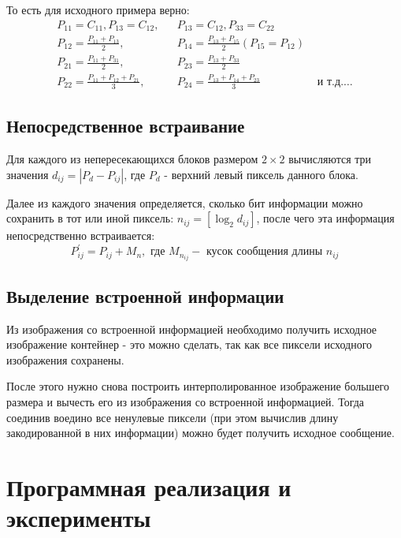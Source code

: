 \documentclass[a4paper]{article}
\begin{document}
  То есть для исходного примера верно:
  \begin{equation}
    \begin{aligned}
      P_{11} = C_{11}, P_{13} = C_{12}, && P_{13} = C_{12}, P_{33} = C_{22} \\
      P_{12} = \frac{P_{11} + P_{13}}{2}, && P_{14} = \frac{P_{13} + P_{15}}{2} (P_{15} = P_{12}) \\
      P_{21} = \frac{P_{11} + P_{31}}{2}, && P_{23} = \frac{P_{13} + P_{33}}{2} \\
      P_{22} = \frac{P_{11} + P_{12} + P_{21}}{3}, && P_{24} = \frac{P_{13} + P_{14} + P_{23}}{3} & \text{ и т.д.}\dots
    \end{aligned}
  \end{equation}

  \subsection{Непосредственное встраивание}

  Для каждого из непересекающихся блоков размером $2\times 2$ вычисляются
  три значения $d_{ij} = \left|P_d - P_{ij}\right|$, где $P_d$ - верхний
  левый пиксель данного блока.

  Далее из каждого значения определяется, сколько бит информации можно сохранить
  в тот или иной пиксель: $n_{ij} = \left[\log_2{d_{ij}}\right]$, после чего
  эта информация непосредственно встраивается:
  \begin{equation}
    P^{'}_{ij} = P_{ij} + M_{n}, \text{ где } M_{n_{ij}} - \text{ кусок сообщения длины } n_{ij}
  \end{equation}

  \subsection{Выделение встроенной информации}

  Из изображения со встроенной информацией необходимо получить исходное изображение контейнер -
  это можно сделать, так как все пиксели исходного изображения сохранены.

  После этого нужно снова построить интерполированное изображение большего размера и
  вычесть его из изображения со встроенной информацией. Тогда соединив воедино
  все ненулевые пиксели (при этом вычислив длину закодированной в них информации)
  можно будет получить исходное сообщение.

  \newpage
  \section{Программная реализация и эксперименты}
\end{document}
